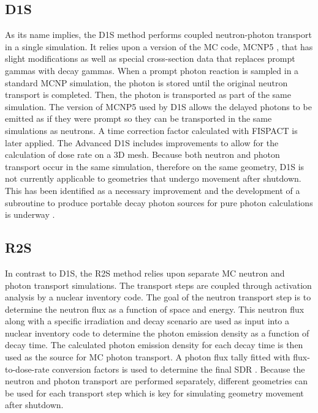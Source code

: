 \subsection{D1S}
As its name implies, the D1S method performs coupled neutron-photon transport
in a single simulation.  It relies upon a version of the MC code,
MCNP5 \cite{mcnp_manual}, that has slight modifications as well as special 
cross-section data that replaces prompt gammas with decay gammas.
When a prompt photon reaction is sampled in a standard MCNP simulation,
the photon is stored until the original neutron transport is
completed. Then, the photon is transported as part of the same simulation.
The version of MCNP5 used by D1S 
allows the delayed 
photons to be emitted as if they were prompt so they can be transported in the same simulations
as neutrons. A time correction factor calculated with FISPACT \cite{fispact} is later applied.
The Advanced D1S \cite{adv-d1s} includes improvements to allow for the
calculation of dose rate on a 3D mesh.
Because both neutron and photon transport occur in the same simulation,
therefore on the same geometry, D1S
is not currently applicable to geometries that undergo movement after shutdown.
This has been identified as a necessary improvement and the development of a
subroutine to produce portable decay photon sources for pure photon
calculations is underway \cite{adv-d1s}. 

\subsection{R2S}\label{sec:r2s}
In contrast to D1S, the R2S method relies upon separate MC neutron and photon
transport simulations.  The transport steps are coupled through activation analysis 
by a nuclear inventory code.
The goal of the neutron transport step is to determine the neutron flux
as a function of space and energy.  This neutron flux along with a specific irradiation
and decay scenario are used as input into a nuclear inventory
code to determine the photon emission density as a function of decay time.
The calculated photon emission density for each decay time
is then used as the source for MC photon transport.  A photon flux tally
fitted with flux-to-dose-rate conversion factors is used to
determine the final SDR \cite{r2s}.
Because the neutron and photon transport are performed separately,
different geometries can be used for each transport step which is key for
simulating geometry movement after shutdown.
